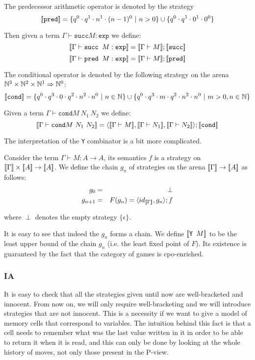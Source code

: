 The predecessor arithmetic operator is denoted by the strategy
$${[\![ \texttt{pred} ]\!]} = \{q^0 \cdot q^1 \cdot n^1 \cdot (n-1)^0\ |\ n >0 \} \cup \{ q^0 \cdot q^1 \cdot 0^1 \cdot 0^0 \} $$

Then given a term $\Gamma \vdash \texttt{succ} M : \texttt{exp}$ we define:
$${[\![ \Gamma \vdash \texttt{succ } M : \texttt{exp} ]\!]} = {[\![ \Gamma \vdash M ]\!]} ; {[\![ \texttt{succ} ]\!]} $$
$${[\![ \Gamma \vdash \texttt{pred } M : \texttt{exp} ]\!]} = {[\![ \Gamma \vdash M ]\!]} ; {[\![ \texttt{pred} ]\!]} $$


The conditional operator is denoted by the following strategy on the arena $\mathbb{N}^3 \times \mathbb{N}^2 \times \mathbb{N} ^1 \Rightarrow \mathbb{N}^0$:
$${[\![ \texttt{cond} ]\!]} =
    \{ q^0 \cdot q^3 \cdot 0 \cdot q^2 \cdot n^2 \cdot n^0 \ | \ n \in \mathbb{N} \}
    \cup
    \{ q^0 \cdot q^3 \cdot m \cdot q^2 \cdot n^2 \cdot n^0 \ | \ m >0, n \in \mathbb{N} \}
    $$


Given a term $\Gamma \vdash \texttt{cond} M\ N_1\ N_2$ we define:
$$\sem{\Gamma \vdash \texttt{cond} M\ N_1\ N_2} =
\langle \sem{\Gamma \vdash M}, \sem{\Gamma \vdash N_1}, \sem{\Gamma \vdash N_2} \rangle ; \sem{\texttt{cond}}$$


The interpretation of the \texttt{Y} combinator is a bit more complicated.

Consider the term $\Gamma \vdash M : A \rightarrow A$, its semantics $f$ is a strategy on ${[\![ \Gamma ]\!]} \times {[\![A ]\!]} \rightarrow {[\![A ]\!]}$.
We define the chain $g_n$ of strategies on the arena ${[\![ \Gamma ]\!]} \rightarrow {[\![A ]\!]}$ as follows:
\begin{eqnarray*}
g_0 &=& \perp \\
g_{n+1} &=&  F(g_n) = \langle id_{{[\![ \Gamma ]\!]}}, g_n\rangle ; f
\end{eqnarray*}

where $\perp$ denotes the empty strategy $\{ \epsilon \}$.

It is easy to see that indeed the $g_n$ forms a chain.
We define ${[\![ \texttt{Y } M ]\!]}$ to be the least upper bound of the chain $g_n$
(i.e. the  least fixed point of $F$). Its existence is guaranteed by the fact that
the category of games is cpo-enriched.

\subsubsection{IA}

It is easy to check that all the strategies given until now are well-bracketed and innocent.
From now on, we will only require well-bracketing and we will introduce strategies that are
not innocent. This is a necessity if we want to give a model of memory cells that correspond
to variables. The intuition behind this fact is that a cell needs to remember what was the last value written in it
in order to be able to return it when it is read, and this can only be done by looking at the whole history of moves,
not only those present in the P-view.





